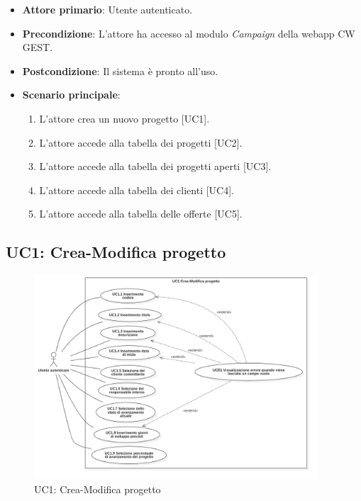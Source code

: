 \begin{itemize}
\item \textbf{Attore primario}: Utente autenticato.
\item \textbf{Precondizione}: L'attore ha accesso al modulo \textit{Campaign} della webapp CW GEST.
\item \textbf{Postcondizione}: Il sistema è pronto all'uso.
\item \textbf{Scenario principale}: 
\begin{enumerate}
\item L'attore crea un nuovo progetto [UC1].
\item L'attore accede alla tabella dei progetti [UC2].
\item L'attore accede alla tabella dei progetti aperti [UC3].
\item L'attore accede alla tabella dei clienti [UC4].
\item L'attore accede alla tabella delle offerte [UC5].
\end{enumerate}
\end{itemize}

\pagebreak

\subsection{UC1: Crea-Modifica progetto}
\begin{figure}[!h]
\centering
\includegraphics[width=400px]{../images/UC/.jpeg/UC1-nuovoModificaProgetto.jpg}
\caption{UC1: Crea-Modifica progetto}
\end{figure}

